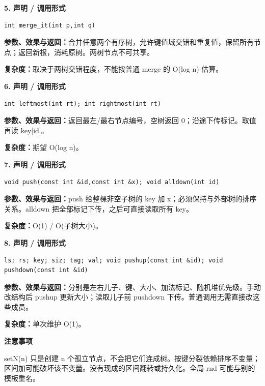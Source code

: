 \documentclass[UTF8,a4paper,10pt]{ctexart}
\newcommand{\TemplNote}[1]{\textbf{注意事项}\par #1\par}
\begin{document}
\noindent\begin{minipage}{\textwidth}
\textbf{5. 声明 / 调用形式}
\begin{lstlisting}
int merge_it(int p,int q)
\end{lstlisting}
\textbf{参数、效果与返回：}合并任意两个有序树，允许键值域交错和重复值，保留所有节点；返回新根，消耗原树。两树节点不可共享。

\textbf{复杂度：}取决于两树交错程度，不能按普通 merge 的 O(log n) 估算。

\end{minipage}\par\vspace{0.4em}
\noindent\begin{minipage}{\textwidth}
\textbf{6. 声明 / 调用形式}
\begin{lstlisting}
int leftmost(int rt); int rightmost(int rt)
\end{lstlisting}
\textbf{参数、效果与返回：}返回最左/最右节点编号，空树返回 0；沿途下传标记。取值再读 key[id]。

\textbf{复杂度：}期望 O(log n)。

\end{minipage}\par\vspace{0.4em}
\noindent\begin{minipage}{\textwidth}
\textbf{7. 声明 / 调用形式}
\begin{lstlisting}
void push(const int &id,const int &x); void alldown(int id)
\end{lstlisting}
\textbf{参数、效果与返回：}push 给整棵非空子树的 key 加 x；必须保持与外部树的排序关系。alldown 把全部标记下传，之后可直接读取所有 key。

\textbf{复杂度：}O(1) / O(子树大小)。

\end{minipage}\par\vspace{0.4em}
\noindent\begin{minipage}{\textwidth}
\textbf{8. 声明 / 调用形式}
\begin{lstlisting}
ls; rs; key; siz; tag; val; void pushup(const int &id); void pushdown(const int &id)
\end{lstlisting}
\textbf{参数、效果与返回：}分别是左右儿子、键、大小、加法标记、随机堆优先级。手动改结构后 pushup 更新大小；读取儿子前 pushdown 下传。普通调用无需直接改这些成员。

\textbf{复杂度：}单次维护 O(1)。

\TemplNote{setN(n) 只是创建 n 个孤立节点，不会把它们连成树。按键分裂依赖排序不变量；区间加可能破坏该不变量。没有现成的区间翻转或持久化。全局 rnd 可能与别的模板重名。}
\end{minipage}\par\vspace{0.4em}
\clearpage
\end{document}
